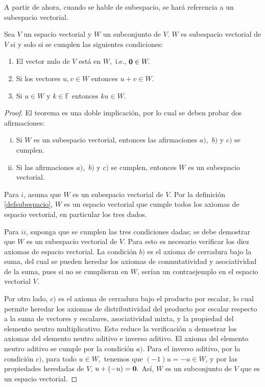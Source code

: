 \begin{rem}A partir de ahora, cuando se hable de subespacio, se hará referencia a un subespacio vectorial.
\end{rem}

\begin{theorem}\label{testsubespacio} Sea $V$ un espacio vectorial y $W$ un subconjunto de $V$. $W$ es subespacio vectorial de $V$ si y solo si se cumplen las siguientes condiciones:
\begin{enumerate}[$a)$]
\item El vector nulo de $V$ está en $W,$ i.e., ${\bf{0}}\in W.$
\item Si los vectores $u,v\in W$ entonces $u+v\in W.$
\item Si $u\in W$ y $k\in \mathbb{F}$ entonces $ku\in W.$
\end{enumerate}
\begin{proof}
El teorema es una doble implicación, por lo cual se deben probar dos afirmaciones: 
\begin{enumerate}[i.]
\item Si $W$ es un subespacio vectorial, entonces las afirmaciones $a),$ $b)$ y $c)$ se cumplen. 
\item Si las afirmaciones $a),$ $b)$ y $c)$ se cumplen, entonces $W$ es un subespacio vectorial. \end{enumerate}
Para $i$, asuma que $W$ es un subespacio vectorial de $V$. Por la definición \ref{defsubespacio}, $W$ es un espacio vectorial que cumple todos los axiomas de espacio vectorial, en particular los tres dados.

Para $ii$, suponga que se cumplen las tres condiciones dadas; se debe demostrar que $W$ es un subespacio vectorial de $V.$ Para esto es necesario verificar los diez axiomas de espacio vectorial. La condición $b)$ es el axioma de cerradura bajo la suma, del cual se pueden heredar los axiomas de conmutatividad y asociatividad de la suma, pues si no se cumplieran en $W$, serían un contraejemplo en el espacio vectorial $V.$ 

Por otro lado, $c)$ es el axioma de cerradura bajo el producto por escalar, lo cual permite heredar los axiomas de distributividad del producto por escalar respecto a la suma de vectores y escalares, asociatividad mixta, y la propiedad del elemento neutro multiplicativo. Esto reduce la verificación a demostrar los axiomas del elemento neutro aditivo e inverso aditivo. El axioma del elemento neutro aditivo se cumple por la condición $a)$. Para el inverso aditivo, por la condición $c)$, para todo $u\in W,$ tenemos que $(-1)u = -u\in W$, y por las propiedades heredadas de $V$, $u+(-u)=\bf{0}.$ Así, $W$ es un subconjunto de $V$ que es un espacio vectorial. 
\end{proof}

\end{theorem}

